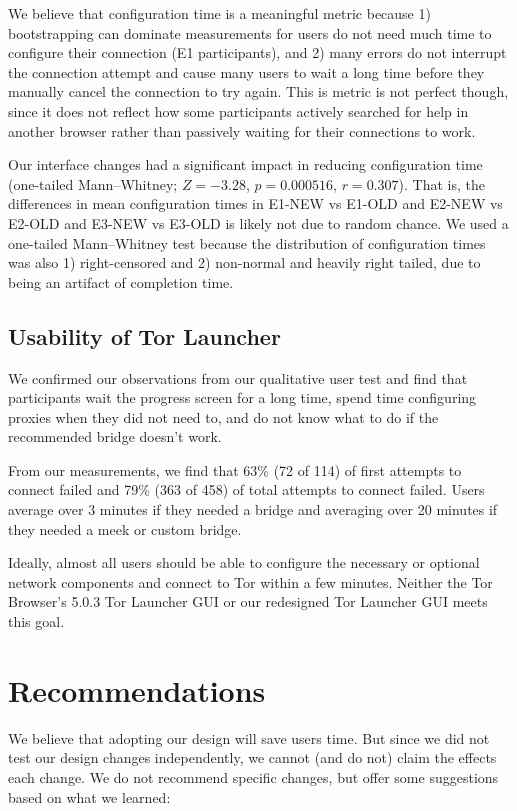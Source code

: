 \documentclass[USenglish,oneside,twocolumn]{article}
\begin{document}
We believe that configuration time is a meaningful metric because 1) bootstrapping can dominate measurements for users do not need much time to configure their connection (E1 participants), and 2) many errors do not interrupt the connection attempt and cause many users to wait a long time before they manually cancel the connection to try again. This is metric is not perfect though, since it does not reflect how some participants actively searched for help in another browser rather than passively waiting for their connections to work. 

Our interface changes had a significant impact in reducing configuration time (one-tailed Mann--Whitney; $Z = -3.28$, $p = 0.000516$, $r = 0.307$). That is, the differences in mean configuration times in E1-NEW vs E1-OLD and E2-NEW vs E2-OLD and E3-NEW vs E3-OLD is likely not due to random chance. We used a one-tailed Mann--Whitney test because the distribution of configuration times was also 1) right-censored and 2) non-normal and heavily right tailed, due to being an artifact of completion time. 

\subsection{Usability of Tor Launcher} 
We confirmed our observations from our qualitative user test and find that participants wait the progress screen for a long time, spend time configuring proxies when they did not need to, and do not know what to do if the recommended bridge doesn't work. 

From our measurements, we find that 63\% (72 of 114) of first attempts to connect failed and 79\% (363 of 458) of total attempts to connect failed. Users average over 3 minutes if they needed a bridge and averaging over 20 minutes if they needed a meek or custom bridge. 

Ideally, almost all users should be able to configure the necessary or optional network components and connect to Tor within a few minutes. Neither the Tor Browser's 5.0.3 Tor Launcher GUI or our redesigned Tor Launcher GUI meets this goal. 

\section{Recommendations}
\label{sec:recommendations}
We believe that adopting our design will save users time. But since we did not test our design changes independently, we cannot (and do not) claim the effects each change. We do not recommend specific changes, but offer some suggestions based on what we learned: \\
\end{document}
